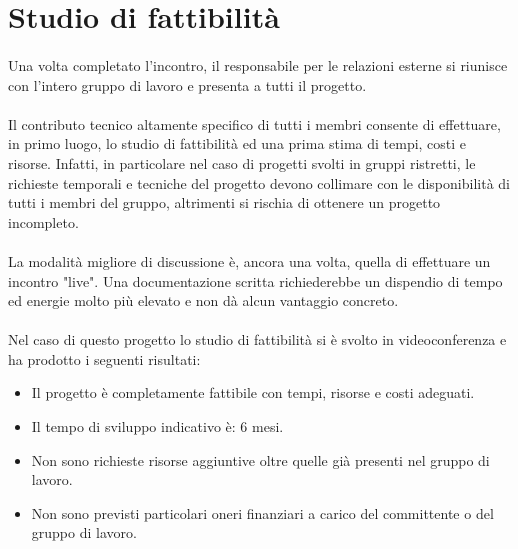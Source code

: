 \documentclass[12pt,a4paper,twoside,english,italian]{book}
\begin{document}
\section{Studio di fattibilità}

\paragraph{} Una volta completato l'incontro, il responsabile per le relazioni esterne si riunisce con l'intero gruppo di lavoro e presenta a tutti il progetto. 

\paragraph{} Il contributo tecnico altamente specifico di tutti i membri consente di effettuare, in primo luogo, lo studio di fattibilità ed una prima stima di tempi, costi e risorse. Infatti, in particolare nel caso di progetti svolti in gruppi ristretti, le richieste temporali e tecniche del progetto devono collimare con le disponibilità di tutti i membri del gruppo, altrimenti si rischia di ottenere un progetto incompleto.

\paragraph{} La modalità migliore di discussione è, ancora una volta, quella di effettuare un incontro "live". Una documentazione scritta richiederebbe un dispendio di tempo ed energie molto più elevato e non dà alcun vantaggio concreto. 

\paragraph{} Nel caso di questo progetto lo studio di fattibilità si è svolto in videoconferenza e ha prodotto i seguenti risultati:
\begin{itemize}
    \item Il progetto è completamente fattibile con tempi, risorse e costi adeguati.
    \item Il tempo di sviluppo indicativo è: 6 mesi.
    \item Non sono richieste risorse aggiuntive oltre quelle già presenti nel gruppo di lavoro.
    \item Non sono previsti particolari oneri finanziari a carico del committente o del gruppo di lavoro.
\end{itemize}
\end{document}
